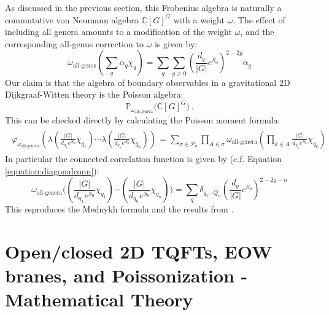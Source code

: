 \documentclass[a4paper,11pt]{article}
\theoremstyle{definition}
\numberwithin{equation}{section}
\newcommand{\lb}{\left(}
\newcommand{\rb}{\right)}
\begin{document}
As discussed in the previous section, this Frobenius algebra is naturally a commutative von Neumann algebra $\mathbb{C}[G]^G$ with a weight $\omega$. The effect of including all genera amounts to a modification of the weight $\omega$, and the corresponding all-genus correction to $\omega$ is given by:
\begin{equation}
    \omega_\text{all-genus}(\sum_q\alpha_q\chi_q) = \sum_q\sum_{g\geq 0}\lb\frac{d_q}{|G|}e^{S_0}\rb^{2-2g}\alpha_q
\end{equation}
Our claim is that the algebra of boundary observables in a gravitational 2D Dijkgraaf-Witten theory
is the Poisson algebra:
\begin{equation}
    \mathbb{P}_{\omega_\text{all-genera}}\bigg(\mathbb{C}[G]^G\bigg)\ .
\end{equation}
This can be checked directly by calculating the Poisson moment formula:
\begin{align}
    \begin{split}
        \varphi_{\omega_\text{all-genera}}(\lambda(\frac{|G|}{d_{q_1}e^{S_0}}\chi_{q_1})\cdots\lambda(\frac{|G|}{d_{q_n}e^{S_0}}\chi_{q_n})) &= \sum_{\sigma\in\mathcal{P}_n}\prod_{A\in\sigma}\omega_\text{all-genera}(\prod_{k\in A}\frac{|G|}{d_{q_k}e^{S_0}}\chi_{q_k})
    \end{split}
\end{align}
In particular the connected correlation function is given by (c.f. Equation \ref{equation:diagonalconn}):
\begin{equation}
    \omega_\text{all-genera}\bigg((\frac{|G|}{d_{q_1}e^{S_0}}\chi_{q_1})\cdots(\frac{|G|}{d_{q_n}e^{S_0}}\chi_{q_n})\bigg) = \sum_q\delta_{q_1\cdots Q_n}(\frac{d_q}{|G|}e^{S_0})^{2-2g-n}
\end{equation}
This reproduces the Mednykh formula \cite{mednykh} and the results from \cite{gardiner20212D}.


\section{Open/closed 2D TQFTs, EOW branes, and Poissonization -  Mathematical Theory}\label{app:openclosed}
\end{document}
